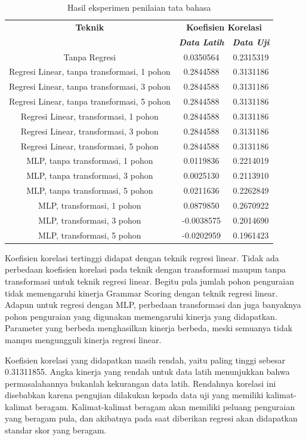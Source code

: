 \documentclass[conference]{IEEEtran}
\begin{document}
\begin{table}[h]
\caption{Hasil eksperimen penilaian tata bahasa}
\begin{center}
\begin{tabular}{|c|c|c|}
\hline
\textbf{Teknik}&\multicolumn{2}{|c|}{\textbf{Koefisien Korelasi}} \\
\cline{2-3} 
 & \textbf{\textit{Data Latih}}& \textbf{\textit{Data Uji}} \\
\hline
Tanpa Regresi& 0.0350564& 0.2315319 \\
Regresi Linear, tanpa transformasi, 1 pohon& 0.2844588&
0.3131186  \\
Regresi Linear, tanpa transformasi, 3 pohon&0.2844588 & 0.3131186 \\
Regresi Linear, tanpa transformasi, 5 pohon&0.2844588 & 0.3131186 \\
Regresi Linear, transformasi, 1 pohon&0.2844588 & 0.3131186 \\
Regresi Linear, transformasi, 3 pohon&0.2844588 &0.3131186  \\
Regresi Linear, transformasi, 5 pohon&0.2844588 & 0.3131186 \\
MLP, tanpa transformasi, 1 pohon&0.0119836 & 0.2214019 \\
MLP, tanpa transformasi, 3 pohon&0.0025130 &0.2113910  \\
MLP, tanpa transformasi, 5 pohon&0.0211636 & 0.2262849 \\
MLP, transformasi, 1 pohon&0.0879850 &0.2670922  \\
MLP, transformasi, 3 pohon&-0.0038575 &0.2014690  \\
MLP, transformasi, 5 pohon&-0.0202959 &0.1961423  \\
\hline
\end{tabular}
\label{tabeksperimenscoring}
\end{center}
\end{table}

Koefisien korelasi tertinggi didapat dengan teknik regresi linear. Tidak ada perbedaan koefisien korelasi pada teknik dengan transformasi maupun tanpa transformasi untuk teknik regresi linear. Begitu pula jumlah pohon penguraian tidak memengaruhi kinerja Grammar Scoring dengan teknik regresi linear. Adapun untuk regresi dengan MLP, perbedaan transformasi dan juga banyaknya pohon penguraian yang digunakan memengaruhi kinerja yang didapatkan. Parameter yang berbeda menghasilkan kinerja berbeda, meski semuanya tidak mampu mengungguli kinerja regresi linear.

Koefisien korelasi yang didapatkan masih rendah, yaitu paling tinggi sebesar 0.31311855. Angka kinerja yang rendah untuk data latih menunjukkan bahwa permasalahannya bukanlah kekurangan data latih. Rendahnya korelasi ini disebabkan karena pengujian dilakukan kepada data uji yang memiliki kalimat-kalimat beragam. Kalimat-kalimat beragam akan memiliki peluang penguraian yang beragam pula, dan akibatnya pada saat diberikan regresi akan didapatkan standar skor yang beragam.
\end{document}
